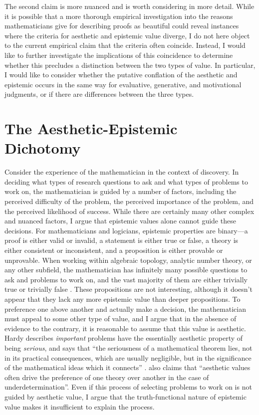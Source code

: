 \documentclass[a4paper,man,natbib]{apa6}
\begin{document}
The second claim is more nuanced and is worth considering in more detail. While it is possible that a more thorough 
empirical investigation into the reasons mathematicians give for describing proofs as beautiful could reveal instances
where the criteria for aesthetic and epistemic value diverge, I do not here object to the current empirical claim 
that the criteria often coincide. Instead, I would like to further investigate the implications of this coincidence
to determine whether this precludes a distinction between the two types of value. In particular, I
would like to consider whether the putative conflation of the aesthetic and epistemic occurs in the same
way for evaluative, generative, and motivational judgments, or if there are differences between the three types.

\section{The Aesthetic-Epistemic Dichotomy}

Consider the experience of the mathematician in the context of discovery. In deciding what types of research questions
to ask and what types of problems to work on, the mathematician is guided by a number of factors, including the
perceived difficulty of the problem, the perceived importance of the problem, and the perceived likelihood of success.
While there are certainly many other complex and nuanced factors, I argue that epistemic values alone cannot guide
these decisions. For mathematicians and logicians, epistemic properties are binary---a proof is either valid or
invalid, a statement is either true or false, a theory is either consistent or inconsistent, and a proposition
is either provable or unprovable. When working within algebraic topology, analytic number
theory, or any other subfield, the mathematician has infinitely many possible questions to ask and problems to work
on, and the vast majority of them are either trivially true or trivially false \citep[p. 324-325]{poincare_mathematical_1910}. 
These propositions are not interesting,
although it doesn't appear that they lack any more epistemic value than deeper propositions. To preference one 
above another and actually make a decision, the mathematician must appeal to some other type of value, and I argue
that in the absence of evidence to the contrary, it is reasonable to assume that this value is aesthetic. Hardy
describes \textit{important} problems have the essentially aesthetic property of being \textit{serious}, and says 
that ``the seriousness of a mathematical 
theorem lies, not in its practical consequences, which are usually negligible, but in the significance of the 
mathematical ideas which it connects'' \citep[p. 16]{hardy_mathematicians_1940}. \cite{ivanova_aesthetic_2017} 
also claims that ``aesthetic values often drive the preference of one theory over another in the case of 
underdetermination''. Even if this process of selecting problems to work on is not guided by aesthetic value, 
I argue that the truth-functional nature of epistemic value makes it insufficient to explain the process.
\end{document}
